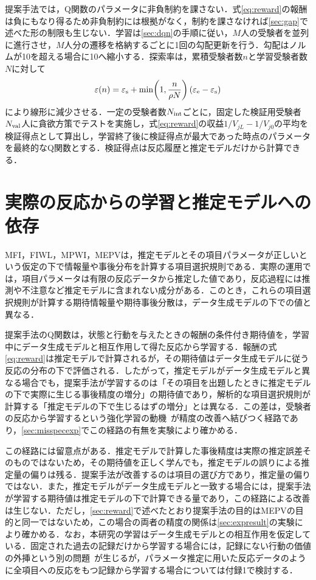 \documentclass[a4paper,12pt,oneside,openany]{jsbook}
\begin{document}
提案手法では，Q関数のパラメータに非負制約を課さない．式\eqref{eq:reward}の報酬は負にもなり得るため非負制約には根拠がなく，制約を課さなければ\ref{sec:gap}で述べた形の制限も生じない．学習は\ref{sec:dqn}の手順に従い，$M$人の受験者を並列に進行させ，$M$人分の遷移を格納するごとに1回の勾配更新を行う．勾配はノルムが10を超える場合に10へ縮小する．探索率は，累積受験者数$n$と学習受験者数$N$に対して
\begin{equation}
 \varepsilon(n)=\varepsilon_{\rm s}+\min\!\left(1,\frac{n}{\rho N}\right)(\varepsilon_{\rm e}-\varepsilon_{\rm s})
 \label{eq:epsilon}
\end{equation}
により線形に減少させる．一定の受験者数$N_{\rm int}$ごとに，固定した検証用受験者$N_{\rm val}$人に貪欲方策でテストを実施し，式\eqref{eq:reward}の収益$1/V_{jL}-1/V_{j0}$の平均を検証得点として算出し，学習終了後に検証得点が最大であった時点のパラメータを最終的なQ関数とする．検証得点は反応履歴と推定モデルだけから計算できる．

\section{実際の反応からの学習と推定モデルへの依存}\label{sec:misspec}

MFI，FIWL，MPWI，MEPVは，推定モデルとその項目パラメータが正しいという仮定の下で情報量や事後分布を計算する項目選択規則である．実際の運用では，項目パラメータは有限の反応データから推定した値であり，反応過程には推測や不注意など推定モデルに含まれない成分がある．このとき，これらの項目選択規則が計算する期待情報量や期待事後分散は，データ生成モデルの下での値と異なる．

提案手法のQ関数は，状態と行動を与えたときの報酬の条件付き期待値を，学習中にデータ生成モデルと相互作用して得た反応から学習する．報酬の式\eqref{eq:reward}は推定モデルで計算されるが，その期待値はデータ生成モデルに従う反応の分布の下で評価される．したがって，推定モデルがデータ生成モデルと異なる場合でも，提案手法が学習するのは「その項目を出題したときに推定モデルの下で実際に生じる事後精度の増分」の期待値であり，解析的な項目選択規則が計算する「推定モデルの下で生じるはずの増分」とは異なる．この差は，受験者の反応から学習するという強化学習の動機~\cite{WangLiuXu2024}が精度の改善へ結びつく経路であり，\ref{sec:misspecexp}でこの経路の有無を実験により確かめる．

この経路には留意点がある．推定モデルで計算した事後精度は実際の推定誤差そのものではないため，その期待値を正しく学んでも，推定モデルの誤りによる推定量の偏りは残る．提案手法が改善するのは項目の選び方であり，推定量の偏りではない．また，推定モデルがデータ生成モデルと一致する場合には，提案手法が学習する期待値は推定モデルの下で計算できる量であり，この経路による改善は生じない．ただし，\ref{sec:reward}で述べたとおり提案手法の目的はMEPVの目的と同一ではないため，この場合の両者の精度の関係は\ref{sec:expresult}の実験により確かめる．なお，本研究の学習はデータ生成モデルとの相互作用を仮定している．固定された過去の記録だけから学習する場合には，記録にない行動の価値の外挿という別の問題~\cite{Fujimoto2019}が生じるが，パラメータ推定に用いた反応データのように全項目への反応をもつ記録から学習する場合については付録1で検討する．
\end{document}
